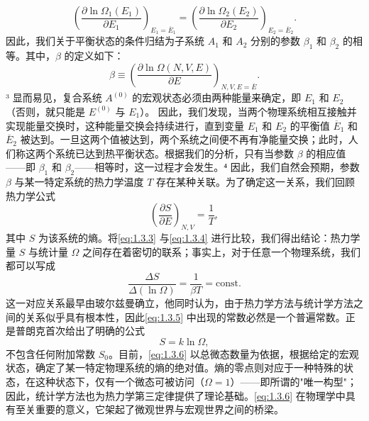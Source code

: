 \begin{equation}\tag{1.2.6}\label{eq:1.2.6}
\left( \frac { \partial \ln \Omega _ { 1 } ( E _ { 1 } ) } { \partial E _ { 1 } } \right) _ { E _ { 1 } = \overline { { E } } _ { 1 } } = \left( \frac { \partial \ln \Omega _ { 2 } ( E _ { 2 } ) } { \partial E _ { 2 } } \right) _ { E _ { 2 } = \overline { { E } } _ { 2 } } .
\end{equation}
因此，我们关于平衡状态的条件归结为子系统 \(A_{1}\) 和 \(A_{2}\) 分别的参数 \(\beta_{1}\) 和 \(\beta_{2}\) 的相等。其中，\(\beta\) 的定义如下：
\begin{equation}\tag{1.2.7}\label{eq:1.2.7}
\beta \equiv \left( \frac { \partial \ln \Omega ( N , V , E ) } { \partial E } \right) _ { N , V , E = \overline { { E } } } .
\end{equation}
³ 显而易见，复合系统 \(A^{(0)}\) 的宏观状态必须由两种能量来确定，即 \(E_{1}\) 和 \(E_{2}\)（否则，就只能是 \(E^{(0)}\) 与 \(E_{1}\)）。
因此，我们发现，当两个物理系统相互接触并实现能量交换时，这种能量交换会持续进行，直到变量 \(E_{1}\) 和 \(E_{2}\) 的平衡值 \(\overline{E}_{1}\) 和 \(\overline{E}_{2}\) 被达到。一旦这两个值被达到，两个系统之间便不再有净能量交换；此时，人们称这两个系统已达到热平衡状态。根据我们的分析，只有当参数 \(\beta\) 的相应值——即 \(\beta_{1}\) 和 \(\beta_{2}\)——相等时，这一过程才会发生。⁴ 因此，我们自然会预期，参数 \(\beta\) 与某一特定系统的热力学温度 \(T\) 存在某种关联。为了确定这一关系，我们回顾热力学公式
\begin{equation}\tag{1.2.8}\label{eq:1.2.8}
\left( \frac { \partial S } { \partial E } \right) _ { N , V } = \frac { 1 } { T } ,
\end{equation}
其中 \(S\) 为该系统的熵。将\autoref{eq:1.3.3} 与\autoref{eq:1.3.4} 进行比较，我们得出结论：热力学量 \(S\) 与统计量 \(\Omega\) 之间存在着密切的联系；事实上，对于任意一个物理系统，我们都可以写成
\begin{equation}\tag{1.2.9}\label{eq:1.2.9}
{ \frac { \Delta S } { \Delta ( \ln \Omega ) } } = { \frac { 1 } { \beta T } } = \mathrm { c o n s t . }
\end{equation}
这一对应关系最早由玻尔兹曼确立，他同时认为，由于热力学方法与统计学方法之间的关系似乎具有根本性，因此\autoref{eq:1.3.5} 中出现的常数必然是一个普遍常数。正是普朗克首次给出了明确的公式
\begin{equation}\tag{1.2.10}\label{eq:1.2.10}
S = k \ln \Omega ,
\end{equation}
不包含任何附加常数 \(S_0\)。目前，\autoref{eq:1.3.6} 以总微态数量为依据，根据给定的宏观状态，确定了某一特定物理系统的熵的绝对值。熵的零点则对应于一种特殊的状态，在这种状态下，仅有一个微态可被访问（\(\Omega=1\)）——即所谓的"唯一构型"；因此，统计学方法也为热力学第三定律提供了理论基础。\autoref{eq:1.3.6} 在物理学中具有至关重要的意义，它架起了微观世界与宏观世界之间的桥梁。
